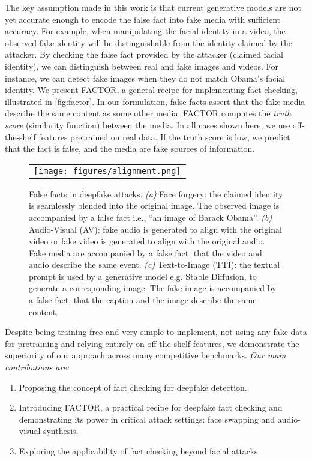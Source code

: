 \documentclass{article} \usepackage{iclr2024_conference,times}
\begin{document}
The key assumption made in this work is that current generative models are not yet accurate enough to encode the false fact into fake media with sufficient accuracy. For example, when manipulating the facial identity in a video, the observed fake identity will be distinguishable from the identity claimed by the attacker. By checking the false fact provided by the attacker (claimed facial identity), we can distinguish between real and fake images and videos. For instance, we can detect fake images when they do not match Obama's facial identity. We present FACTOR, a general recipe for implementing fact checking, illustrated in \cref{fig:factor}. In our formulation, false facts assert that the fake media describe the same content as some other media. FACTOR computes the \textit{truth score} (similarity function) between the media. In all cases shown here, we use off-the-shelf features pretrained on real data. If the truth score is low, we predict that the fact is false, and the media are fake sources of information.

\begin{figure}[t]
  \begin{center}
    \begin{tabular}{c}
    \texttt{[image: figures/alignment.png]} 
    \end{tabular}
  \end{center}
  \vspace{-0.5em}
    \caption{False facts in deepfake attacks. \textit{(a)} Face forgery: the claimed identity is seamlessly blended into the original image. The observed image is accompanied by a false fact i.e., “an image of Barack Obama”. \textit{(b)} Audio-Visual (AV): fake audio is generated to align with the original video or fake video is generated to align with the original audio. Fake media are accompanied by a false fact, that the video and audio describe the same event. \textit{(c)} Text-to-Image (TTI): the textual prompt is used by a generative model e.g. Stable Diffusion, to generate a corresponding image. The fake image is accompanied by a false fact, that the caption and the image describe the same content.}
    \label{fig:conditional_df}
    \vspace{-0.25em}
\end{figure}

Despite being training-free and very simple to implement, not using any fake data for pretraining and relying entirely on off-the-shelf features, we demonstrate the superiority of our approach across many competitive benchmarks. \textit{Our main contributions are:}
\begin{enumerate}
    \item Proposing the concept of fact checking for deepfake detection.
    \item Introducing FACTOR, a practical recipe for deepfake fact checking and demonstrating its power in critical attack settings: face swapping and audio-visual synthesis.
    \item Exploring the applicability of fact checking beyond facial attacks.
\end{enumerate}
\end{document}
